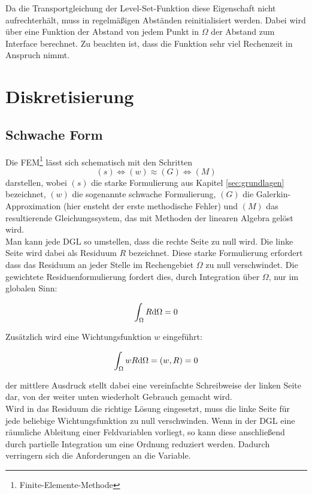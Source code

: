 Da die Transportgleichung der Level-Set-Funktion diese Eigenschaft nicht aufrechterhält, muss in regelmäßigen Abständen reinitialisiert werden. Dabei wird über eine Funktion der Abstand von jedem Punkt in $\Omega$ der Abstand zum Interface berechnet. Zu beachten ist, dass die Funktion sehr viel Rechenzeit in Anspruch nimmt.

\section{Diskretisierung}
\subsection{Schwache Form}
Die FEM\footnote{Finite-Elemente-Methode} lässt sich schematisch mit den Schritten
\[(s) \iff (w) \approx (G) \iff (M)\]
darstellen, wobei $(s)$ die starke Formulierung aus Kapitel \ref{sec:grundlagen} bezeichnet, $(w)$ die sogenannte schwache Formulierung, $(G)$ die Galerkin-Approximation (hier ensteht der erste methodische Fehler) und $(M)$ das resultierende Gleichungssystem, das mit Methoden der linearen Algebra gelöst wird.\\

Man kann jede DGL so umstellen, dass die rechte Seite zu null wird. Die linke Seite wird dabei als Residuum $R$ bezeichnet. Diese starke Formulierung erfordert dass das Residuum an jeder Stelle im Rechengebiet $\Omega$ zu null verschwindet. Die gewichtete Residuenformulierung fordert dies, durch Integration über $\Omega$, nur im globalen Sinn:

\begin{equation}
 \int_\Omega R \mathrm{d}\Omega = 0
\end{equation}

Zusätzlich wird eine Wichtungsfunktion $w$ eingeführt:

\begin{equation}
 \int_\Omega wR\mathrm{d}\Omega = (w,R) = 0
\end{equation}

der mittlere Ausdruck stellt dabei eine vereinfachte Schreibweise der linken Seite dar, von der weiter unten wiederholt Gebrauch gemacht wird.\\

Wird in das Residuum die richtige Lösung eingesetzt, muss die linke Seite für jede beliebige Wichtungsfunktion zu null verschwinden. Wenn in der DGL eine räumliche Ableitung einer Feldvariablen vorliegt, so kann diese anschließend durch partielle Integration um eine Ordnung reduziert werden. Dadurch verringern sich die Anforderungen an die Variable.

